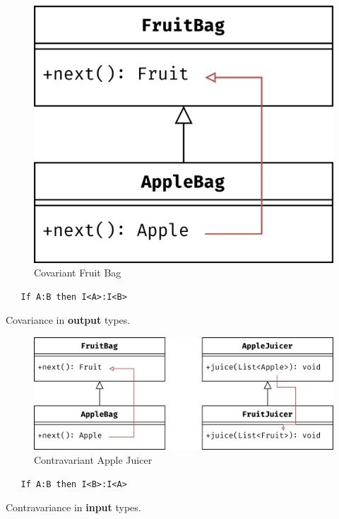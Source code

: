 \begin{paracol}{2}
   \begin{figure}[htbp]
      \centering
      \includegraphics{images/variance1.png}
      \caption{Covariant Fruit Bag}
      \label{fig:variance1}
   \end{figure}
   \begin{lstlisting}
   If A:B then I<A>:I<B>
   \end{lstlisting}

   Covariance in \textbf{output} types.
   
   \switchcolumn

   \begin{figure}[htbp]
      \centering
      \includegraphics{images/variance2.png}
      \caption{Contravariant Apple Juicer}
      \label{fig:variance2}
   \end{figure}
   \begin{lstlisting}
   If A:B then I<B>:I<A>
   \end{lstlisting}

   Contravariance in \textbf{input} types.

\end{paracol}


